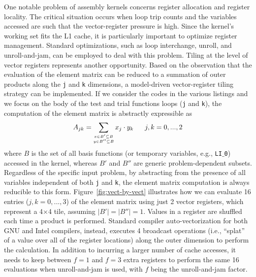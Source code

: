 One notable problem of assembly kernels concerns register allocation and register locality. The critical situation occurs when loop trip counts and the variables accessed are such that the vector-register pressure is high. Since the kernel's working set fits the L1 cache, it is particularly important to optimize register management. Standard optimizations, such as loop interchange, unroll, and unroll-and-jam, can be employed to deal with this problem. Tiling at the level of vector registers represents another opportunity. Based on the observation that the evaluation of the element matrix can be reduced to a summation of outer products along the \texttt{j} and \texttt{k} dimensions, a model-driven vector-register tiling strategy can be implemented. If we consider the codes in the various listings and we focus on the body of the test and trial functions loops (\texttt{j} and \texttt{k}), the computation of the element matrix is abstractly expressible as
\begin{equation}
\scriptsize
\label{outer-product}
A_{jk} = \sum_{\substack{
  x \in B' \subseteq B \\
  y \in B'' \subseteq B}}
x_j\cdot y_k ~~~~~~ j,k = 0,...,2
\end{equation}
where $B$ is the set of all basis functions (or temporary variables, e.g., \texttt{LI$\_$0}) accessed in the kernel, whereas $B'$ and $B''$ are generic problem-dependent subsets. Regardless of the specific input problem, by abstracting from the presence of all variables independent of both \texttt{j} and \texttt{k}, the element matrix computation is always reducible to this form. Figure~\ref{fig:vect-by-vect} illustrates how we can evaluate 16 entries ($j,k=0,...,3$) of the element matrix using just 2 vector registers, which represent a 4$\times$4 tile, assuming $\vert B' \vert = \vert B'' \vert = 1$. Values in a register are shuffled each time a product is performed. Standard compiler auto-vectorization for both GNU and Intel compilers, instead, executes 4 broadcast operations (i.e., ``splat'' of a value over all of the register locations) along the outer dimension to perform the calculation. In addition to incurring a larger number of cache accesses, it needs to keep between $f=1$ and $f=3$ extra registers to perform the same 16 evaluations when unroll-and-jam is used, with $f$ being the unroll-and-jam factor.


